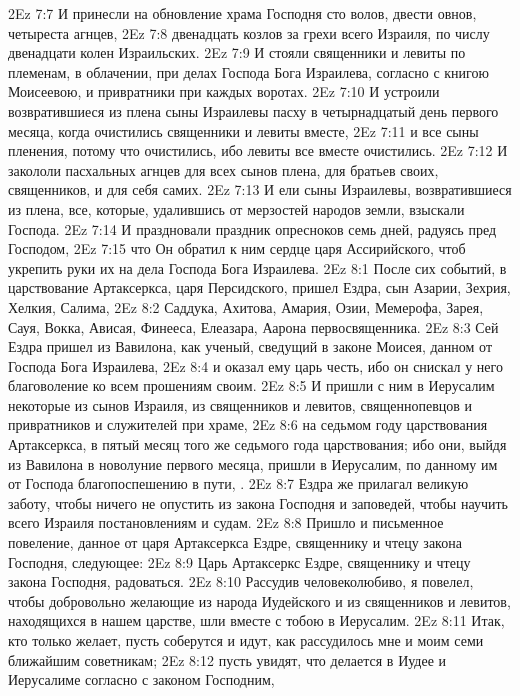 \vs 2Ez 7:7 И принесли  на обновление храма Господня сто волов, двести овнов, четыреста агнцев,
\vs 2Ez 7:8 двенадцать козлов за грехи всего Израиля, по числу двенадцати колен Израильских.
\vs 2Ez 7:9 И стояли священники и левиты по племенам, в облачении, при делах Господа Бога Израилева, согласно с книгою Моисеевою, и привратники при каждых воротах.
\vs 2Ez 7:10 И устроили возвратившиеся из плена сыны Израилевы пасху в четырнадцатый день первого месяца, когда очистились священники и левиты вместе,
\vs 2Ez 7:11 и все сыны пленения, потому что очистились, ибо левиты все вместе очистились.
\vs 2Ez 7:12 И закололи пасхальных агнцев для всех сынов плена, для братьев своих, священников, и для себя самих.
\vs 2Ez 7:13 И ели сыны Израилевы, возвратившиеся из плена, все, которые, удалившись от мерзостей народов земли, взыскали Господа.
\vs 2Ez 7:14 И праздновали праздник опресноков семь дней, радуясь пред Господом,
\vs 2Ez 7:15 что Он обратил к ним сердце царя Ассирийского, чтоб укрепить руки их на дела Господа Бога Израилева.
\vs 2Ez 8:1 После сих событий, в царствование Артаксеркса, царя Персидского, пришел Ездра, сын Азарии, Зехрия, Хелкия, Салима,
\vs 2Ez 8:2 Саддука, Ахитова, Амария, Озии, Мемерофа, Зарея, Сауя, Вокка, Ависая, Финееса, Елеазара, Аарона первосвященника.
\vs 2Ez 8:3 Сей Ездра пришел из Вавилона, как ученый, сведущий в законе Моисея, данном от Господа Бога Израилева,
\vs 2Ez 8:4 и оказал ему царь честь, ибо он снискал у него благоволение ко всем прошениям своим.
\vs 2Ez 8:5 И пришли с ним в Иерусалим некоторые из сынов Израиля, из священников и левитов, священнопевцов и привратников и служителей при храме,
\vs 2Ez 8:6 на седьмом году царствования Артаксеркса, в пятый месяц того же седьмого года царствования; ибо они, выйдя из Вавилона в новолуние первого месяца, пришли в Иерусалим, по данному им от Господа благопоспешению в пути, .
\rsbpar\vs 2Ez 8:7 Ездра же прилагал великую заботу, чтобы ничего не опустить из закона Господня и заповедей, чтобы научить всего Израиля постановлениям и судам.
\vs 2Ez 8:8 Пришло и письменное повеление, данное от царя Артаксеркса Ездре, священнику и чтецу закона Господня, следующее:
\vs 2Ez 8:9 Царь Артаксеркс Ездре, священнику и чтецу закона Господня, радоваться.
\vs 2Ez 8:10 Рассудив человеколюбиво, я повелел, чтобы добровольно желающие из народа Иудейского и из священников и левитов, находящихся в нашем царстве, шли вместе с тобою в Иерусалим.
\vs 2Ez 8:11 Итак, кто только желает, пусть соберутся и идут, как рассудилось мне и моим семи ближайшим советникам;
\vs 2Ez 8:12 пусть увидят, что делается в Иудее и Иерусалиме согласно с законом Господним,
